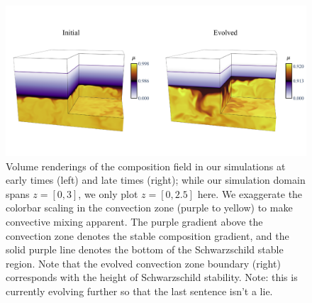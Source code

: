 \documentclass[twocolumn, linenumbers]{aastex631}
\begin{document}
\begin{figure}[t!]
\centering
\includegraphics[width=\textwidth]{dynamics_figure.pdf}
\caption{
    Volume renderings of the composition field in our simulations at early times (left) and late times (right); while our simulation domain spans $z = [0, 3]$, we only plot $z = [0, 2.5]$ here.
    We exaggerate the colorbar scaling in the convection zone (purple to yellow) to make convective mixing apparent.
    The purple gradient above the convection zone denotes the stable composition gradient, and the solid purple line denotes the bottom of the Schwarzschild stable region.
    Note that the evolved convection zone boundary (right) corresponds with the height of Schwarzschild stability.
    {\color{blue} Note: this is currently evolving further so that the last sentence isn't a lie.}
\label{fig:dynamics}
}
\end{figure}


\end{document}
